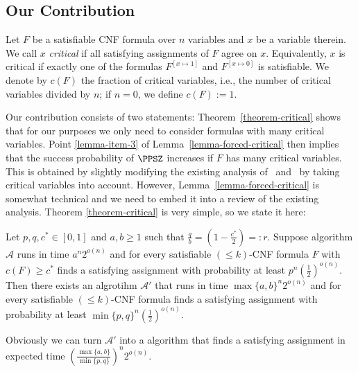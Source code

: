 \subsection{Our Contribution}

Let $F$ be a satisfiable CNF formula over $n$ variables and $x$ be a variable therein.
We call $x$ {\em critical} if all satisfying assignments of $F$ agree
on $x$. Equivalently, $x$ is critical if exactly one of the formulas
$F^{[x \mapsto 1]}$ and $F^{[x \mapsto 0]}$ is satisfiable. We denote by $c(F)$ the fraction of
critical variables, i.e., the number of critical variables divided by
$n$; if $n=0$, we define $c(F):=1$.

Our contribution consists of two statements: Theorem~\ref{theorem-critical} shows that for our purposes we only need to consider formulas with many critical variables. Point \ref{lemma-item-3} of Lemma~\ref{lemma-forced-critical} then implies that the success
probability of $\PPSZ$ increases if $F$ has many critical variables. This is obtained by slightly modifying the existing analysis of~\cite{ppsz} and~\cite{rolf2006} by taking critical variables into account. However, Lemma~\ref{lemma-forced-critical} is somewhat technical and we need to embed it into a review of the existing analysis.
Theorem \ref{theorem-critical} is very simple, so we state it here:
\begin{theorem}
\label{theorem-critical}
Let $p,q,c^*\in [0,1]$ and $a,b\geq 1$ such that $\frac{q}{b}=\left(1-\frac{c^*}{2}\right)=:r$. Suppose algorithm $\mathcal{A}$ runs in time $a^n 2^{o(n)}$ and for every satisfiable $(\leq k)$-CNF formula $F$ with $c(F)\geq c^*$ finds a satisfying assignment with probability at least $p^n \left(\frac{1}{2}\right)^{o(n)}$. Then there exists an algrotihm $\mathcal{A}'$ that runs in time $\max\{a,b\}^n 2^{o(n)}$ and for every satisfiable $(\leq k)$-CNF formula finds a satisfying assignment with probability at least $\min\{p,q\}^{n}\left(\frac{1}{2}\right)^{o(n)}$.
\end{theorem}
Obviously we can turn $\mathcal{A'}$ into a algorithm that finds a satisfying assignment in expected time $\left(\frac{\max\{a,b\}}{\min\{p,q\}}\right)^n 2^{o(n)}$.
